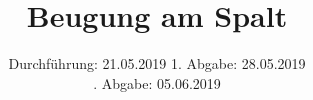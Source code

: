 

\subject{V406}
\title{Beugung am Spalt}
\date{%
  Durchführung: 21.05.2019
  \hspace{3em}
  1. Abgabe: 28.05.2019 \\
  \hspace{15em}\!\!. Abgabe: 05.06.2019
}



\maketitle
\thispagestyle{empty}
\tableofcontents
\newpage






\printbibliography{}


